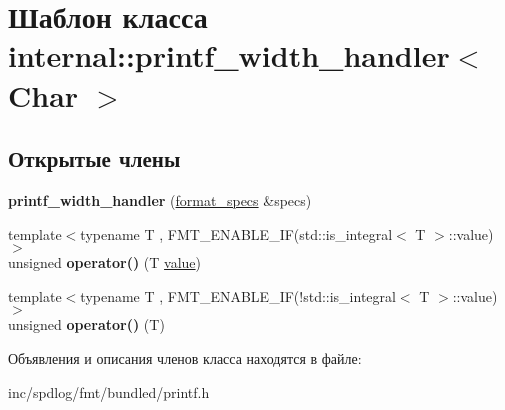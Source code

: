 \hypertarget{classinternal_1_1printf__width__handler}{}\section{Шаблон класса internal\+:\+:printf\+\_\+width\+\_\+handler$<$ Char $>$}
\label{classinternal_1_1printf__width__handler}
\subsection*{Открытые члены}
\begin{DoxyCompactItemize}
\item 
\mbox{\label{classinternal_1_1printf__width__handler_a5f6cd8905b62908b23f55f83836940b4}} 
{\bfseries printf\+\_\+width\+\_\+handler} (\hyperlink{structbasic__format__specs}{format\+\_\+specs} \&specs)
\item 
\mbox{\label{classinternal_1_1printf__width__handler_a2c95dc447d997ccb95fccd529b6751f2}} 
{\footnotesize template$<$typename T , F\+M\+T\+\_\+\+E\+N\+A\+B\+L\+E\+\_\+\+I\+F(std\+::is\+\_\+integral$<$ T $>$\+::value) $>$ }\\unsigned {\bfseries operator()} (T \hyperlink{classinternal_1_1value}{value})
\item 
\mbox{\label{classinternal_1_1printf__width__handler_a0dc16dd048f473ebd194d307ed5e4162}} 
{\footnotesize template$<$typename T , F\+M\+T\+\_\+\+E\+N\+A\+B\+L\+E\+\_\+\+I\+F(!std\+::is\+\_\+integral$<$ T $>$\+::value) $>$ }\\unsigned {\bfseries operator()} (T)
\end{DoxyCompactItemize}


Объявления и описания членов класса находятся в файле\+:\begin{DoxyCompactItemize}
\item 
inc/spdlog/fmt/bundled/printf.\+h\end{DoxyCompactItemize}
